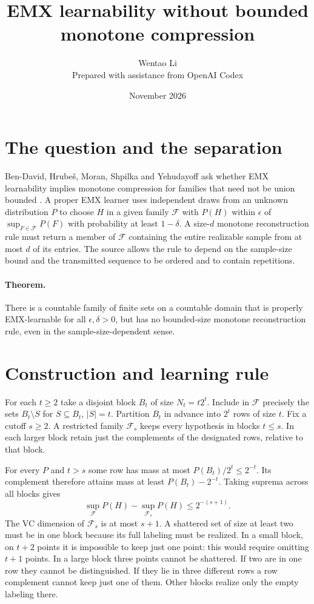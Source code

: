 \documentclass[11pt]{article}
\title{EMX learnability without bounded monotone compression}
\author{Wentao Li\\[2pt]\small Prepared with assistance from OpenAI Codex}
\date{November 2026}
\begin{document}
\maketitle
\section{The question and the separation}
Ben-David, Hrube\v{s}, Moran, Shpilka and Yehudayoff ask whether EMX learnability implies monotone compression for families that need not be union bounded \cite[\S7, Question 1]{emx}. A proper EMX learner uses independent draws from an unknown distribution $P$ to choose $H$ in a given family $\mathcal F$ with $P(H)$ within $\epsilon$ of $\sup_{F\in\mathcal F}P(F)$ with probability at least $1-\delta$. A size-$d$ monotone reconstruction rule must return a member of $\mathcal F$ containing the entire realizable sample from at most $d$ of its entries. The source allows the rule to depend on the sample-size bound and the transmitted sequence to be ordered and to contain repetitions.

\paragraph{Theorem.} There is a countable family of finite sets on a countable domain that is properly EMX-learnable for all $\epsilon,\delta>0$, but has no bounded-size monotone reconstruction rule, even in the sample-size-dependent sense.

\section{Construction and learning rule}
For each $t\ge2$ take a disjoint block $B_t$ of size $N_t=t2^t$. Include in $\mathcal F$ precisely the sets $B_t\setminus S$ for $S\subseteq B_t$, $|S|=t$. Partition $B_t$ in advance into $2^t$ rows of size $t$. Fix a cutoff $s\ge2$. A restricted family $\mathcal F_s$ keeps every hypothesis in blocks $t\le s$. In each larger block retain just the complements of the designated rows, relative to that block.

For every $P$ and $t>s$ some row has mass at most $P(B_t)/2^t\le2^{-t}$. Its complement therefore attains mass at least $P(B_t)-2^{-t}$. Taking suprema across all blocks gives
\[
 \sup_{\mathcal F}P(H)-\sup_{\mathcal F_s}P(H)\le 2^{-(s+1)}.
\]
The VC dimension of $\mathcal F_s$ is at most $s+1$. A shattered set of size at least two must be in one block because its full labeling must be realized. In a small block, on $t+2$ points it is impossible to keep just one point: this would require omitting $t+1$ points. In a large block three points cannot be shattered. If two are in one row they cannot be distinguished. If they lie in three different rows a row complement cannot keep just one of them. Other blocks realize only the empty labeling there.
\end{document}
